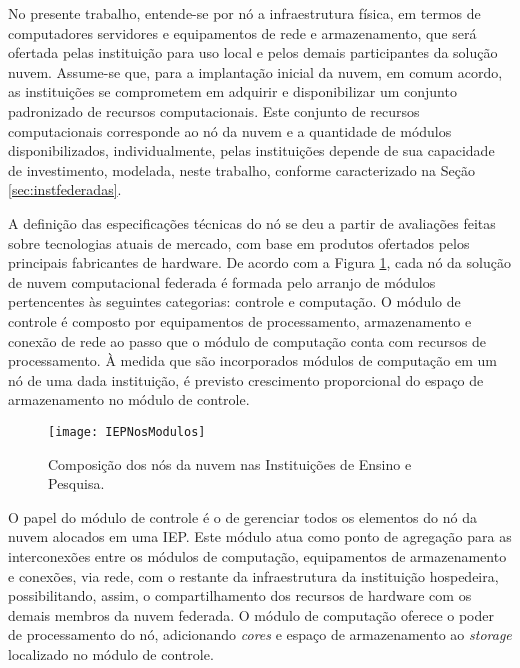 \documentclass[tese,capa]{texufpel}
\begin{document}
No presente trabalho, entende-se por nó a infraestrutura física, em termos de computadores servidores e equipamentos de rede e armazenamento, que será ofertada pelas instituição para uso local e pelos demais participantes da solução nuvem. Assume-se que, para a implantação inicial da nuvem, em comum acordo, as instituições se comprometem em adquirir e disponibilizar um conjunto padronizado de recursos computacionais. Este conjunto de recursos computacionais corresponde ao nó da nuvem e a quantidade de módulos disponibilizados, individualmente, pelas instituições depende de sua capacidade de investimento, modelada, neste trabalho, conforme caracterizado na Seção \ref{sec:instfederadas}.

A definição das especificações técnicas do nó se deu a partir de avaliações feitas sobre tecnologias atuais de mercado, com base em produtos ofertados pelos principais fabricantes de hardware. De acordo com a Figura \ref{fig:IEPNosModulos}, cada nó da solução de nuvem computacional federada é formada pelo arranjo de módulos pertencentes às seguintes categorias: controle e computação. O módulo de controle é composto por equipamentos de processamento, armazenamento e conexão de rede ao passo que o módulo de computação conta com recursos de processamento. À medida que são incorporados módulos de computação em um nó de uma dada instituição, é previsto crescimento proporcional do espaço de armazenamento no módulo de controle.

\begin{figure}[H]
	\centering 
	\texttt{[image: IEPNosModulos]}
	\caption[Composição dos nós da nuvem nas Instituições de Ensino e Pesquisa.]{Composição dos nós da nuvem nas Instituições de Ensino e Pesquisa.} 
	\label{fig:IEPNosModulos}
\end{figure}

O papel do módulo de controle é o de gerenciar todos os elementos do nó da nuvem alocados em uma IEP. Este módulo atua como ponto de agregação para as interconexões entre os módulos de computação, equipamentos de armazenamento e conexões, via rede, com o restante da infraestrutura da instituição hospedeira, possibilitando, assim, o compartilhamento dos recursos de hardware com os demais membros da nuvem federada. O módulo de computação oferece o poder de processamento do nó, adicionando \emph{cores} e espaço de armazenamento ao \emph{storage} localizado no módulo de controle.
\end{document}
